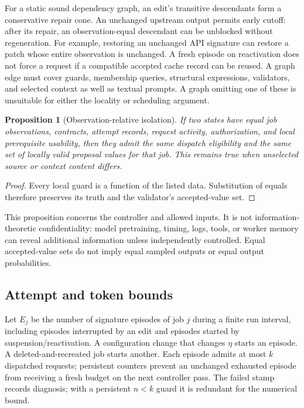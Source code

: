 \documentclass[pdflatex,sn-mathphys-num]{sn-jnl}
\theoremstyle{thmstyleone}
\newtheorem{proposition}[theorem]{Proposition}
\theoremstyle{thmstylethree}
\theoremstyle{thmstyletwo}
\begin{document}
For a static sound dependency graph, an edit's transitive descendants form a conservative repair cone. An unchanged upstream output permits early cutoff: after its repair, an observation-equal descendant can be unblocked without regeneration. For example, restoring an unchanged API signature can restore a patch whose entire observation is unchanged. A fresh episode on reactivation does not force a request if a compatible accepted cache record can be reused. A graph edge must cover guards, membership queries, structural expressions, validators, and selected context as well as textual prompts. A graph omitting one of these is unsuitable for either the locality or scheduling argument.

\begin{proposition}[Observation-relative isolation]\label{prop:isolation}
If two states have equal job observations, contracts, attempt records, request activity, authorization, and local prerequisite usability, then they admit the same dispatch eligibility and the same set of locally valid proposal values for that job. This remains true when unselected source or context content differs.
\end{proposition}
\begin{proof}
Every local guard is a function of the listed data. Substitution of equals therefore preserves its truth and the validator's accepted-value set.\qedhere
\end{proof}
This proposition concerns the controller and allowed inputs. It is not information-theoretic confidentiality: model pretraining, timing, logs, tools, or worker memory can reveal additional information unless independently controlled. Equal accepted-value sets do not imply equal sampled outputs or equal output probabilities.

\subsection{Attempt and token bounds}
Let $E_j$ be the number of signature episodes of job $j$ during a finite run interval, including episodes interrupted by an edit and episodes started by suspension/reactivation. A configuration change that changes $\eta$ starts an episode. A deleted-and-recreated job starts another. Each episode admits at most $k$ dispatched requests; persistent counters prevent an unchanged exhausted episode from receiving a fresh budget on the next controller pass. The failed stamp records diagnosis; with a persistent $n<k$ guard it is redundant for the numerical bound.
\end{document}
